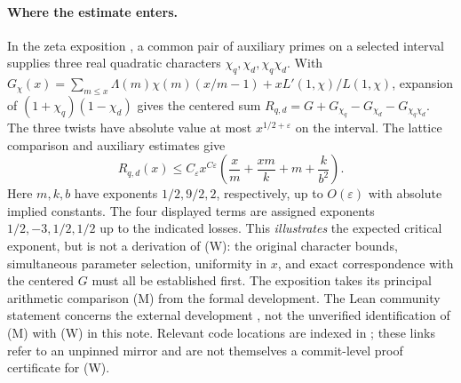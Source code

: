 \documentclass[11pt,a4paper]{article}
\newcommand{\eps}{\varepsilon}
\begin{document}
\paragraph{Where the estimate enters.}
In the zeta exposition \cite[Part I, \S I.6 and Part II, (II.6)--(II.8), (A)]{rub}, a common pair of auxiliary primes on a selected interval supplies three real quadratic characters $\chi_q,\chi_d,\chi_q\chi_d$. With $G_\chi(x)=\sum_{m\le x}\Lambda(m)\chi(m)(x/m-1)+xL'(1,\chi)/L(1,\chi)$, expansion of $(1+\chi_q)(1-\chi_d)$ gives the centered sum $R_{q,d}=G+G_{\chi_q}-G_{\chi_d}-G_{\chi_q\chi_d}$. The three twists have absolute value at most $x^{1/2+\eps}$ on the interval. The lattice comparison and auxiliary estimates give
\[
 R_{q,d}(x)\le C_\eps x^{C\eps}
 \left(\frac{x}{m}+\frac{xm}{k}+m+\frac{k}{b^2}\right).
\]
Here $m,k,b$ have exponents $1/2,9/2,2$, respectively, up to $O(\eps)$ with absolute implied constants. The four displayed terms are assigned exponents $1/2,-3,1/2,1/2$ up to the indicated losses. This \emph{illustrates} the expected critical exponent, but is not a derivation of (W): the original character bounds, simultaneous parameter selection, uniformity in $x$, and exact correspondence with the centered $G$ must all be established first. The exposition takes its principal arithmetic comparison (M) from the formal development. The Lean community statement concerns the external development \cite{lean}, not the unverified identification of (M) with (W) in this note. Relevant code locations are indexed in \cite{archive}; these links refer to an unpinned mirror and are not themselves a commit-level proof certificate for (W).
\end{document}
